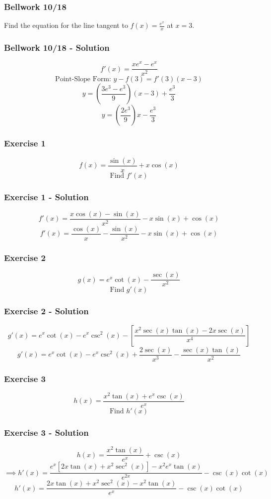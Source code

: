 \documentclass[12pt]{beamer}
\begin{document}
\begin{frame}
	\frametitle{Bellwork 10/18}
	\initclock

	\vfill
	\vfill
	\vfill
	\vfill
	\vfill
	\Large
	Find the equation for the line tangent to $f(x)=\frac{e^x}{x}$ at $x = 3$.
	\vfill
	\vfill
	\vfill
	\vfill
	\vfill
	\vfill
	\vfill
	\vfill

	\small
	\crono
\end{frame}
\begin{frame}
	\frametitle{Bellwork 10/18 - Solution}

	\vfill
	\vfill
	\vfill
	\vfill
	\vfill
	\vfill
	\Large
	\[f'(x)=\frac{xe^x-e^x}{x^2}\]
	\vfill
	\large
	\[\text{Point-Slope Form: }y-f(3)=f'(3)(x-3)\]
	\[y=\left(\frac{3e^3-e^3}{9}\right)(x-3)+\frac{e^3}{3}\]
	\[\boxed{y=\left(\frac{2e^3}{9}\right)x-\frac{e^3}{3}}\]
\end{frame}
\begin{frame}
	\frametitle{Exercise 1}

	\Large
	\[f(x)=\frac{\sin(x)}{x}+x\cos(x)\]
	\vfill
	\[\text{Find }f'(x)\]
\end{frame}
\begin{frame}
	\frametitle{Exercise 1 - Solution}

	\Large
	\[f'(x)=\frac{x\cos(x)-\sin(x)}{x^2}-x\sin(x)+\cos(x)\]
	\[f'(x)=\boxed{\frac{\cos(x)}{x}-\frac{\sin(x)}{x^2}-x\sin(x)+\cos(x)}\]
\end{frame}
\begin{frame}
	\frametitle{Exercise 2}

	\Large
	\[g(x)=e^x\cot(x)-\frac{\sec(x)}{x^2}\]
	\vfill
	\[\text{Find }g'(x)\]
\end{frame}
\begin{frame}
	\frametitle{Exercise 2 - Solution}

	\[g'(x)=e^x\cot(x)-e^x\csc^2(x)-\left[\frac{x^2\sec(x)\tan(x)-2x\sec(x)}{x^4}\right]\]
	\[g'(x)=\boxed{e^x\cot(x)-e^x\csc^2(x)+\frac{2\sec(x)}{x^3}-\frac{\sec(x)\tan(x)}{x^2}}\]
\end{frame}
\begin{frame}
	\frametitle{Exercise 3}

	\Large
	\[h(x)=\frac{x^2\tan(x)+e^x\csc(x)}{e^x}\]
	\vfill
	\[\text{Find }h'(x)\]
\end{frame}
\begin{frame}
	\frametitle{Exercise 3 - Solution}

	\large
	\[h(x)=\frac{x^2\tan(x)}{e^x}+\csc(x)\]
	\vfill
	\small
	\[\implies h'(x)=\frac{e^x[2x\tan(x)+x^2\sec^2(x)]-x^2e^x\tan(x)}{e^{2x}}-\csc(x)\cot(x)\]
	\[h'(x)=\boxed{\frac{2x\tan(x)+x^2\sec^2(x)-x^2\tan(x)}{e^x}-\csc(x)\cot(x)}\]
\end{frame}
\end{document}
